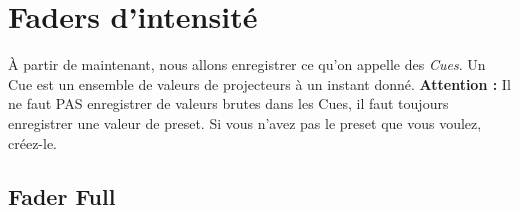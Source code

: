 \section{Faders d'intensité}
\label{sec:faders_intensite}

À partir de maintenant, nous allons enregistrer ce qu'on appelle des \textit{Cues}.
Un Cue est un ensemble de valeurs de projecteurs à un instant donné.
\newline
\newline
\textbf{Attention :} Il ne faut PAS enregistrer de valeurs brutes dans les Cues,
il faut toujours enregistrer une valeur de preset. Si vous n'avez pas le preset
que vous voulez, créez-le.

\subsection{Fader Full}
\label{subsec:fader_full}

